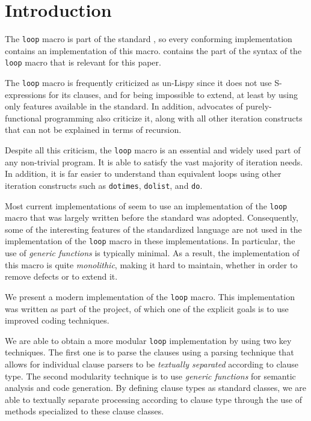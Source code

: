 \section{Introduction}
\label{sec-introduction}

The \texttt{loop} macro is part of the \commonlisp{} standard
\cite{ansi:common:lisp}, so every conforming \commonlisp{}
implementation contains an implementation of this
macro.  contains the part of the syntax of the
\texttt{loop} macro that is relevant for this paper.

The \texttt{loop} macro is frequently criticized as un-Lispy since it
does not use S-expressions for its clauses, and for being impossible
to extend, at least by using only features available in the
\commonlisp{} standard.  In addition, advocates of purely-functional
programming also criticize it, along with all other iteration
constructs that can not be explained in terms of recursion.

Despite all this criticism, the \texttt{loop} macro is an essential
and widely used part of any non-trivial \commonlisp{} program.  It is
able to satisfy the vast majority of iteration needs.  In addition, it
is far easier to understand than equivalent loops using other
iteration constructs such as \texttt{dotimes}, \texttt{dolist}, and
\texttt{do}.

Most current implementations of \commonlisp{} seem to use an
implementation of the \texttt{loop} macro that was largely written
before the \commonlisp{} standard was adopted.  Consequently, some of
the interesting features of the standardized \commonlisp{} language
are not used in the implementation of the \texttt{loop} macro in
these implementations.  In particular, the use of \emph{generic
  functions} is typically minimal.  As a result, the implementation of
this macro is quite \emph{monolithic}, making it hard to maintain,
whether in order to remove defects or to extend it.

We present a modern implementation of the \texttt{loop} macro.  This
implementation was written as part of the \sicl{} project, of
which one of the explicit goals is to use improved coding techniques.

We are able to obtain a more modular \texttt{loop} implementation by
using two key techniques.  The first one is to parse the clauses using
a parsing technique that allows for individual clause parsers to be
\emph{textually separated} according to clause type.  The second
modularity technique is to use \emph{generic functions} for semantic
analysis and code generation.  By defining clause types as standard
classes, we are able to textually separate processing according to
clause type through the use of methods specialized to these clause
classes.
